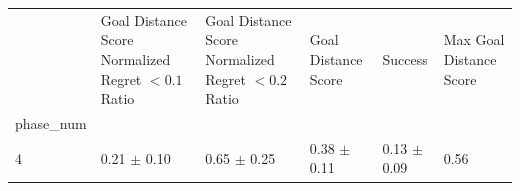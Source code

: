 \begin{tabular}{llllll}
\toprule
 & Goal Distance Score Normalized Regret $< 0.1$ Ratio & Goal Distance Score Normalized Regret $< 0.2$ Ratio & Goal Distance Score & Success & Max Goal Distance Score \\
phase_num &  &  &  &  &  \\
\midrule
4 & 0.21 $\pm$ 0.10 & 0.65 $\pm$ 0.25 & 0.38 $\pm$ 0.11 & 0.13 $\pm$ 0.09 & 0.56 \\
\bottomrule
\end{tabular}
